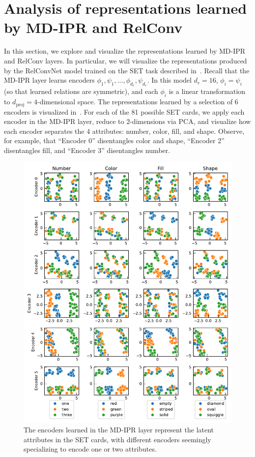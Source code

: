 \section{Analysis of representations learned by MD-IPR and RelConv}\label{sec:appendix_rep_analysis}

In this section, we explore and visualize the representations learned by MD-IPR and RelConv layers. In particular, we will visualize the representations produced by the RelConvNet model trained on the SET task described in~. Recall that the MD-IPR layer learns encoders $\phi_1, \psi_1, \ldots, \phi_{d_r}, \psi_{d_r}$. In this model $d_r = 16$, $\phi_i = \psi_i$ (so that learned relations are symmetric), and each $\phi_i$ is a linear transformation to $d_{\mathrm{proj}} = 4$-dimensional space. The representations learned by a selection of 6 encoders is visualized in~. For each of the 81 possible SET cards, we apply each encoder in the MD-IPR layer, reduce to 2-dimensions via PCA, and visualize how each encoder separates the 4 attributes: number, color, fill, and shape. Observe, for example, that ``Encoder 0'' disentangles color and shape, ``Encoder 2'' disentangles fill, and ``Encoder 3'' disentangles number.
\begin{figure}[!h]
    \centering
    \includegraphics[width=\textwidth]{figs/representation_analysis/mdipr_encoders_rep.pdf}
    \caption{The encoders learned in the MD-IPR layer represent the latent attributes in the SET cards, with different encoders seemingly specializing to encode one or two attributes.}\label{fig:mdirp_encoders_rep}
\end{figure}

